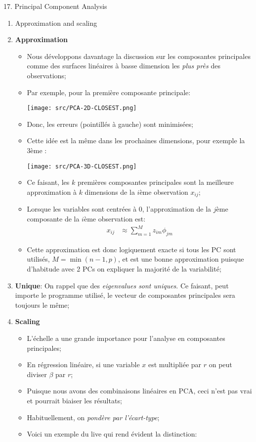 \documentclass[12pt, titlepage, french]{report}
\begin{document}
\begin{CHPT_SUMM}[label = {PCA-PCA}]{17. Principal Component Analysis}
\begin{enumerate}
\begin{itemize}
	\end{itemize}
	\item	Approximation and scaling
	\item[]	\textbf{Approximation}
	\begin{itemize}
		\item	Nous développons davantage la discussion sur les composantes principales comme	 des surfaces linéaires à basse dimension les \textit{plus près} des observations;
		\item	Par exemple, pour la première composante principale: 
		
		\texttt{[image: src/PCA-2D-CLOSEST.png]}
		\item	Donc, les erreurs (pointillés à gauche) sont minimisées;
		\item	Cette idée est la même dans les prochaines dimensions, pour exemple la 3ème :
		
		\texttt{[image: src/PCA-3D-CLOSEST.png]}
		\item	Ce faisant, les $k$ premières composantes principales sont la meilleure approximation à $k$ dimensions de la $i$ème observation $x_{ij}$;
		\item	Lorsque les variables sont centrées à 0, l'approximation de la $j$ème composante de la $i$ème observation est:
			\begin{align*}
			x_{ij}	&\approx	\sum_{m = 1}^{M} z_{im} \phi_{jm}
			\end{align*}
		\item	Cette approximation est donc logiquement exacte si tous les PC sont utilisés, $M = \min(n - 1, p)$, et est une bonne approximation puisque d'habitude avec 2 PCs on expliquer la majorité de la variabilité;
	\end{itemize}
	\item[]	\textbf{Unique}: On rappel que des \textit{eigenvalues sont uniques}. 
			Ce faisant, peut importe le programme utilisé, le vecteur de composantes principales sera toujours le même;
	\item[]	\textbf{Scaling}
		\begin{itemize}
		\item	L'échelle a une grande importance pour l'analyse en composantes principales;
		\item	En régression linéaire, si une variable $x$ est multipliée par $r$ on peut diviser $\beta$ par $r$;
		\item[]	Puisque nous avons des combinaisons linéaires en PCA, ceci n'est pas vrai et pourrait biaiser les résultats;
		\item	Habituellement, on \textit{pondère par l'écart-type};
		\item	Voici un exemple du live qui rend évident la distinction:
		

\end{itemize}
\end{enumerate}
\end{CHPT_SUMM}
\end{document}
